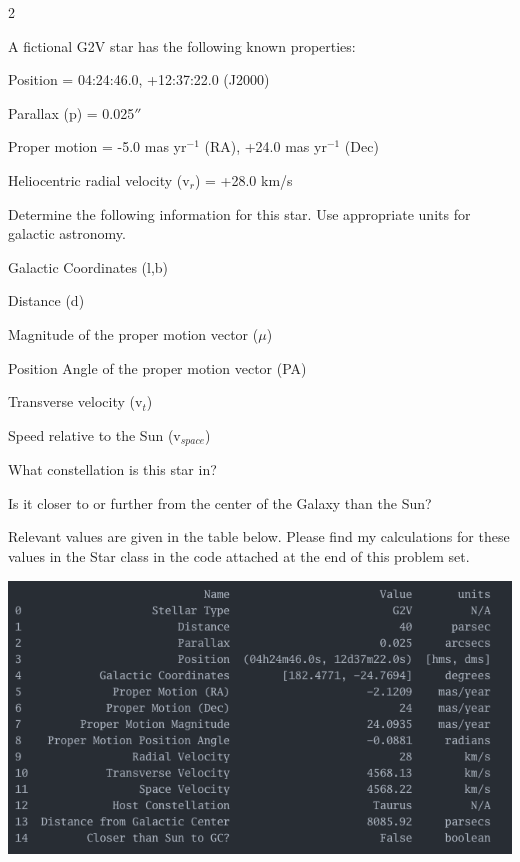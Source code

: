 \documentclass[12pt]{article}
\newenvironment{problem}[2][Problem]{\begin{trivlist}
\item[\hskip \labelsep {\bfseries #1}\hskip \labelsep {\bfseries #2.}]}{\end{trivlist}}
\newenvironment{answer}[2][Answer]{\begin{trivlist}
\item[\hskip \labelsep {\bfseries #1}\hskip \labelsep {\bfseries #2.}]}{\end{trivlist}}
\newenvironment{Figure}
  {\par\medskip\noindent\minipage{\linewidth}}
  {\endminipage\par\medskip}
\begin{document}
\begin{multicols*}{2}
\bigskip \bigskip
\begin{problem}{4} A fictional G2V star has the following known properties:

Position = 04:24:46.0, +12:37:22.0 (J2000)

Parallax (p) = 0.025$''$

Proper motion  = -5.0 mas yr$^{-1}$ (RA), +24.0 mas yr$^{-1}$ (Dec)

Heliocentric radial velocity (v$_r$) = +28.0 km/s

\bigskip

\noindent Determine the following information for this star. Use appropriate units for galactic astronomy.

Galactic Coordinates (l,b)

Distance (d)

Magnitude of the proper motion vector ($\mu$)

Position Angle of the proper motion vector (PA)

Transverse velocity (v$_t$)

Speed relative to the Sun (v$_{space}$)

What constellation is this star in?

Is it closer to or further from the center of the Galaxy than the Sun?

\end{problem}

\begin{answer}{4}


Relevant values are given in the table below. Please find my calculations for these values in the Star class in the code attached at the end of this problem set.

\bigskip
\begin{Figure}
  \centering
  \includegraphics[width=\linewidth]{prob4.png}
\end{Figure}
\bigskip


\end{answer}
\end{multicols*}
\end{document}
